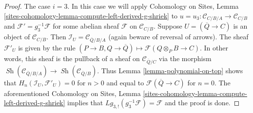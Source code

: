 \documentclass[10pt,a4paper]{amsart}
\theoremstyle{plain}
\theoremstyle{definition}
\theoremstyle{remark}
\numberwithin{equation}{subsection}
\def\Sh{\mathop{\mathit{Sh}}\nolimits}
\begin{document}
\begin{proof}
\medskip\noindent
The case $i = 3$. In this case we will apply
Cohomology on Sites, Lemma
\ref{sites-cohomology-lemma-compute-left-derived-g-shriek}
to $u = u_3 : \mathcal{C}_{C/B/A} \to \mathcal{C}_{C/B}$
and $\mathcal{F}' = g_3^{-1}\mathcal{F}$ for some abelian sheaf
$\mathcal{F}$ on $\mathcal{C}_{C/B}$.
Suppose $U = (\overline{Q} \to C)$ is an object of $\mathcal{C}_{C/B}$.
Then $\mathcal{I}_U = \mathcal{C}_{\overline{Q}/B/A}$ (again beware
of reversal of arrows). The sheaf $\mathcal{F}'_U$ is given by the
rule $(P \to B, Q \to \overline{Q}) \mapsto \mathcal{F}(Q \otimes_P B \to C)$.
In other words, this sheaf is the pullback of a sheaf
on $\mathcal{C}_{\overline{Q}/C}$ via the morphism
$\Sh(\mathcal{C}_{\overline{Q}/B/A}) \to \Sh(\mathcal{C}_{\overline{Q}/B})$.
Thus Lemma \ref{lemma-polynomial-on-top} shows that
$H_n(\mathcal{I}_U, \mathcal{F}'_U) = 0$ for $n > 0$
and equal to $\mathcal{F}(\overline{Q} \to C)$ for $n = 0$.
The aforementioned Cohomology on Sites, Lemma
\ref{sites-cohomology-lemma-compute-left-derived-g-shriek}
implies that $Lg_{3, !}(g_3^{-1}\mathcal{F}) = \mathcal{F}$ and
the proof is done.
\end{proof}
\end{document}
